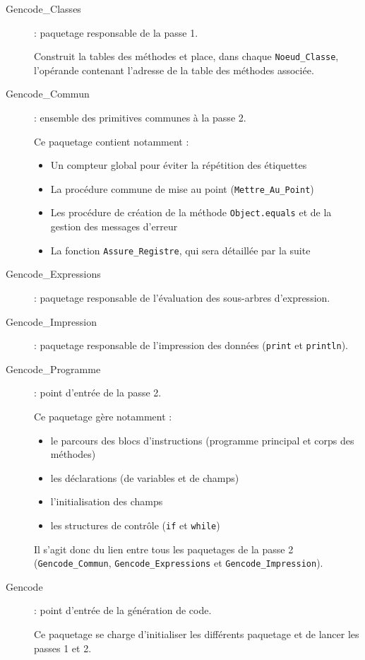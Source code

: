 \begin{description}
      \item[Gencode\_Classes] : paquetage responsable de la passe 1.

        Construit la tables des méthodes et place, dans chaque \verb!Noeud_Classe!, l'opérande contenant l'adresse de la table des méthodes associée.
      \item[Gencode\_Commun] : ensemble des primitives communes à la passe 2.

        Ce paquetage contient notamment :
        \begin{itemize}
        \item Un compteur global pour éviter la répétition des étiquettes
        \item La procédure commune de mise au point (\verb!Mettre_Au_Point!)
        \item Les procédure de création de la méthode \verb!Object.equals! et de la gestion des messages d'erreur
        \item La fonction \verb!Assure_Registre!, qui sera détaillée par la suite
        \end{itemize}

      \item[Gencode\_Expressions] : paquetage responsable de l'évaluation des sous-arbres d'expression.
      \item[Gencode\_Impression] : paquetage responsable de l'impression des données (\verb!print! et \verb!println!).
      \item[Gencode\_Programme] : point d'entrée de la passe 2.

        Ce paquetage gère notamment :
        \begin{itemize}
        \item le parcours des blocs d'instructions (programme principal et corps des méthodes)
        \item les déclarations (de variables et de champs)
        \item l'initialisation des champs
        \item les structures de contrôle (\verb!if! et \verb!while!)
        \end{itemize}

        Il s'agit donc du lien entre tous les paquetages de la passe 2 (\verb!Gencode_Commun!, \verb!Gencode_Expressions! et \verb!Gencode_Impression!).

      \item[Gencode] : point d'entrée de la génération de code.

        Ce paquetage se charge d'initialiser les différents paquetage et de lancer les passes 1 et 2.
\end{description}

